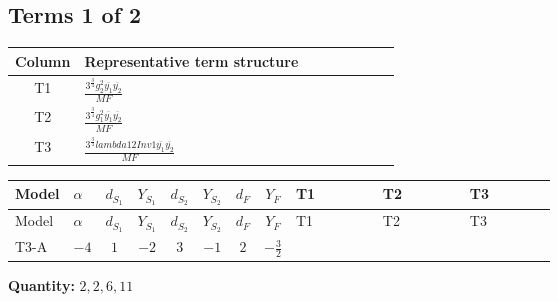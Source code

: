 \documentclass[8pt]{article}
\begin{document}
\begin{landscape}
\subsection*{Terms 1 of 2}
\begin{center}
\begin{tabular}{@{}c >{\raggedright\arraybackslash}p{0.82\linewidth}@{}}
\toprule
Column & Representative term structure \\
\midrule
T1 & \(\displaystyle \frac{3^{\frac{3}{4}} g_{2}^{2} \overline{y_{1}} \overline{y_{2}}}{MF}\) \\
\midrule
T2 & \(\displaystyle \frac{3^{\frac{3}{4}} g_{1}^{2} \overline{y_{1}} \overline{y_{2}}}{MF}\) \\
\midrule
T3 & \(\displaystyle \frac{3^{\frac{3}{4}} lambda12Inv1 \overline{y_{1}} \overline{y_{2}}}{MF}\) \\
\midrule
\bottomrule
\end{tabular}
\end{center}
\smallskip
\tiny
\begin{longtable}{@{}llcccccc >{\raggedright\arraybackslash}p{0.21\linewidth} >{\raggedright\arraybackslash}p{0.21\linewidth} >{\raggedright\arraybackslash}p{0.21\linewidth}@{}}
\toprule
Model & $\alpha$ & $d_{S_1}$ & $Y_{S_1}$ & $d_{S_2}$ & $Y_{S_2}$ & $d_F$ & $Y_F$ & T1 & T2 & T3 \\
\midrule
\endfirsthead
\toprule
Model & $\alpha$ & $d_{S_1}$ & $Y_{S_1}$ & $d_{S_2}$ & $Y_{S_2}$ & $d_F$ & $Y_F$ & T1 & T2 & T3 \\
\midrule
\endhead
T3-A & $-4$ & $1$ & $-2$ & $3$ & $-1$ & $2$ & $-\frac{3}{2}$ & \scriptsize\adjustbox{max width=\linewidth}{$\begin{gathered} - \frac{11 \cdot 3^{\frac{3}{4}} g_{2}^{2} \overline{y_{1}} \overline{y_{2}}}{8 MF}\end{gathered}$} & \scriptsize\adjustbox{max width=\linewidth}{$\begin{gathered} - \frac{9 \cdot 3^{\frac{3}{4}} g_{1}^{2} \overline{y_{1}} \overline{y_{2}}}{8 MF}\end{gathered}$} & \scriptsize\adjustbox{max width=\linewidth}{$\begin{gathered} - \frac{3^{\frac{3}{4}} lambda12Inv1 \overline{y_{1}} \overline{y_{2}}}{6 MF}\end{gathered}$} \\
\midrule
\bottomrule
\end{longtable}
\clearpage
\noindent\textbf{Quantity: }$\mathrm{2,2,6,11}$\par\smallskip

\end{landscape}
\end{document}
